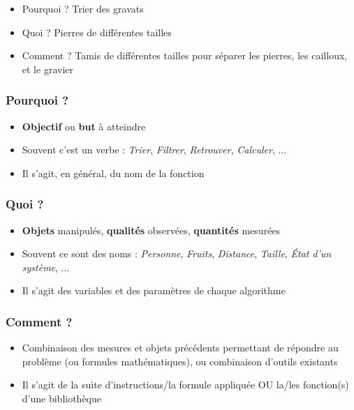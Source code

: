\documentclass[11pt,a4paper]{article}
\begin{document}
\begin{itemize}
\item Pourquoi ? Trier des gravats
\item Quoi ? Pierres de différentes tailles
\item Comment ? Tamis de différentes tailles pour séparer les pierres, les cailloux, et le gravier
\end{itemize}


\subsubsection{Pourquoi ?}

\begin{itemize}
\item \textbf{Objectif} ou \textbf{but} à atteindre
\item Souvent c'est un verbe : \textit{Trier}, \textit{Filtrer}, \textit{Retrouver}, \textit{Calculer}, ...
\item Il s'agit, en général, du nom de la fonction
\end{itemize}


\subsubsection{Quoi ?}

\begin{itemize}
\item \textbf{Objets} manipulés, \textbf{qualités} observées, \textbf{quantités} mesurées
\item Souvent ce sont des noms : \textit{Personne}, \textit{Fruits}, \textit{Distance}, \textit{Taille}, \textit{\'Etat d'un système}, ...
\item Il s'agit des variables et des paramètres de chaque algorithme
\end{itemize}


\subsubsection{Comment ?}

\begin{itemize}
\item Combinaison des mesures et objets précédents permettant de répondre au problème (ou formules mathématiques), ou combinaison d'outils existants
\item Il s'agit de la suite d'instructions/la formule appliquée OU la/les fonction(s) d'une bibliothèque
\end{itemize}
\end{document}
